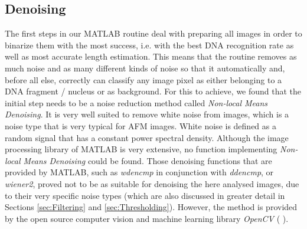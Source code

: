 \documentclass{article}
\begin{document}
\subsection{Denoising}\label{sec:Denoising}
The first steps in our MATLAB routine deal with preparing all images in order to binarize them with the most success, i.e. with the best DNA recognition rate as well as most accurate length estimation. This means that the routine removes as much noise and as many different kinds of noise so that it automatically and, before all else, correctly can classify any image pixel as either belonging to a DNA fragment / nucleus or as background.
For this to achieve, we found that the initial step needs to be a noise reduction method called \textit{Non-local Means Denoising}. It is very well suited to remove white noise from images, which is a noise type that is very typical for AFM images. White noise is defined as a random signal that has a constant power spectral density. Although the image processing library of MATLAB is very extensive, no function implementing \textit{Non-local Means Denoising} could be found. Those denoising functions that are provided by MATLAB, such as \textit{wdencmp} in conjunction with \textit{ddencmp}, or \textit{wiener2}, proved not to be as suitable for denoising the here analysed images, due to their very specific noise types (which are also discussed in greater detail in Sections \ref{sec:Filtering} and \ref{sec:Thresholding}). However, the method is provided by the open source computer vision and machine learning library \textit{OpenCV} (\cite{itseez2016opencvman} \cite{itseez2016opencvlib}). 
\end{document}

